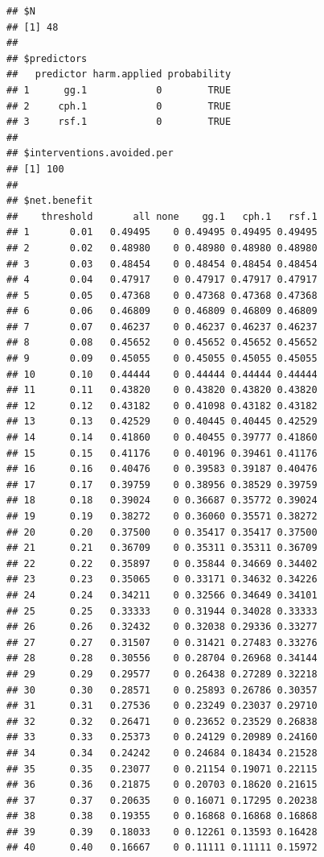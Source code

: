\documentclass{article}\usepackage[]{graphicx}\usepackage[]{color}
\makeatletter
\newenvironment{kframe}{%
 \def\at@end@of@kframe{}%
 \ifinner\ifhmode%
  \def\at@end@of@kframe{\end{minipage}}%
  \begin{minipage}{\columnwidth}%
 \fi\fi%
 \def\FrameCommand##1{\hskip\@totalleftmargin \hskip-\fboxsep
 \colorbox{shadecolor}{##1}\hskip-\fboxsep
     \hskip-\linewidth \hskip-\@totalleftmargin \hskip\columnwidth}%
 \MakeFramed {\advance\hsize-\width
   \@totalleftmargin\z@ \linewidth\hsize
   \@setminipage}}%
 {\par\unskip\endMakeFramed%
 \at@end@of@kframe}
\newenvironment{knitrout}{}{} %
\makeatother
\begin{document}
\begin{knitrout}
\begin{kframe}\begin{verbatim}
## $N
## [1] 48
## 
## $predictors
##   predictor harm.applied probability
## 1      gg.1            0        TRUE
## 2     cph.1            0        TRUE
## 3     rsf.1            0        TRUE
## 
## $interventions.avoided.per
## [1] 100
## 
## $net.benefit
##    threshold       all none    gg.1   cph.1   rsf.1
## 1       0.01   0.49495    0 0.49495 0.49495 0.49495
## 2       0.02   0.48980    0 0.48980 0.48980 0.48980
## 3       0.03   0.48454    0 0.48454 0.48454 0.48454
## 4       0.04   0.47917    0 0.47917 0.47917 0.47917
## 5       0.05   0.47368    0 0.47368 0.47368 0.47368
## 6       0.06   0.46809    0 0.46809 0.46809 0.46809
## 7       0.07   0.46237    0 0.46237 0.46237 0.46237
## 8       0.08   0.45652    0 0.45652 0.45652 0.45652
## 9       0.09   0.45055    0 0.45055 0.45055 0.45055
## 10      0.10   0.44444    0 0.44444 0.44444 0.44444
## 11      0.11   0.43820    0 0.43820 0.43820 0.43820
## 12      0.12   0.43182    0 0.41098 0.43182 0.43182
## 13      0.13   0.42529    0 0.40445 0.40445 0.42529
## 14      0.14   0.41860    0 0.40455 0.39777 0.41860
## 15      0.15   0.41176    0 0.40196 0.39461 0.41176
## 16      0.16   0.40476    0 0.39583 0.39187 0.40476
## 17      0.17   0.39759    0 0.38956 0.38529 0.39759
## 18      0.18   0.39024    0 0.36687 0.35772 0.39024
## 19      0.19   0.38272    0 0.36060 0.35571 0.38272
## 20      0.20   0.37500    0 0.35417 0.35417 0.37500
## 21      0.21   0.36709    0 0.35311 0.35311 0.36709
## 22      0.22   0.35897    0 0.35844 0.34669 0.34402
## 23      0.23   0.35065    0 0.33171 0.34632 0.34226
## 24      0.24   0.34211    0 0.32566 0.34649 0.34101
## 25      0.25   0.33333    0 0.31944 0.34028 0.33333
## 26      0.26   0.32432    0 0.32038 0.29336 0.33277
## 27      0.27   0.31507    0 0.31421 0.27483 0.33276
## 28      0.28   0.30556    0 0.28704 0.26968 0.34144
## 29      0.29   0.29577    0 0.26438 0.27289 0.32218
## 30      0.30   0.28571    0 0.25893 0.26786 0.30357
## 31      0.31   0.27536    0 0.23249 0.23037 0.29710
## 32      0.32   0.26471    0 0.23652 0.23529 0.26838
## 33      0.33   0.25373    0 0.24129 0.20989 0.24160
## 34      0.34   0.24242    0 0.24684 0.18434 0.21528
## 35      0.35   0.23077    0 0.21154 0.19071 0.22115
## 36      0.36   0.21875    0 0.20703 0.18620 0.21615
## 37      0.37   0.20635    0 0.16071 0.17295 0.20238
## 38      0.38   0.19355    0 0.16868 0.16868 0.16868
## 39      0.39   0.18033    0 0.12261 0.13593 0.16428
## 40      0.40   0.16667    0 0.11111 0.11111 0.15972

\end{verbatim}
\end{kframe}
\end{knitrout}
\end{document}
